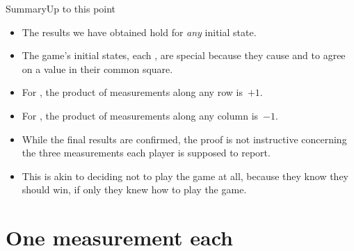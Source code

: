 \begin{frame}{Summary}{Up to this point}
\begin{itemize}[<+->]
    \item The results we have obtained hold for \emph{any} initial state.
    \item The game's initial states, each , are special because they cause \Alice{} and \Bob{} to agree on a value in their common square.
    \item For \Alice{}, the product of measurements along any row is~$+1$.
    \item For \Bob{}, the product of measurements along any column is~$-1$.
    \item While the final results are confirmed, the proof is not instructive concerning the three measurements each player is supposed to report.
    \item This is akin to deciding not to play the game at all, because they know they should win, if only they knew how to play the game.
\end{itemize}
    
\end{frame}

\section*{One measurement each}

